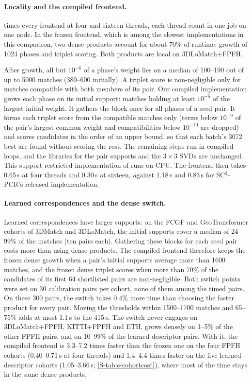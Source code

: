 \paragraph{Locality and the compiled frontend.}  times every frontend at four and sixteen threads, each thread count in one job on one node. In the frozen \ls{} frontend, which is among the slowest implementations in this comparison, two dense products account for about 70\% of runtime: growth of 1024 phases and triplet scoring. Both products are local on 3DLoMatch+FPFH.

After growth, all but $10^{-6}$ of a phase's weight lies on a median of 100--190 out of up to 5000 matches (380--600 initially). A triplet score is non-negligible only for matches compatible with both members of its pair. Our compiled implementation grows each phase on its initial support: matches holding at least $10^{-6}$ of the largest initial weight. It gathers the block once for all phases of a seed pair. It forms each triplet score from the compatible matches only (terms below $10^{-9}$ of the pair's largest common weight and compatibilities below $10^{-10}$ are dropped) and scores candidates in the order of an upper bound, so that each batch's 3072 best are found without scoring the rest. The remaining steps run in compiled loops, and the libraries for the pair supports and the $3\times3$ SVDs are unchanged. This support-restricted implementation of  runs on CPU. The \ls{} frontend then takes 0.65\,s at four threads and 0.30\,s at sixteen, against 1.18\,s and 0.83\,s for SC$^2$-PCR's released implementation.

\paragraph{Learned correspondences and the dense switch.} Learned correspondences have larger supports: on the FCGF and GeoTransformer cohorts of 3DMatch and 3DLoMatch, the initial supports cover a median of 24--99\% of the matches (ten pairs each). Gathering these blocks for each seed pair costs more than using dense products. The compiled frontend therefore keeps the frozen dense growth when a pair's initial supports average more than 1600 matches, and the frozen dense triplet scores when more than 70\% of the candidates of its first 64 shortlisted pairs are non-negligible. Both switch points were set on 30 calibration pairs per cohort, none of them among the timed pairs. On these 300 pairs, the switch takes 0.4\% more time than choosing the faster product for every pair. Moving the thresholds within 1500--1700 matches and 65--75\% adds at most 1.1\,s to the 415\,s. The switch never engages on 3DLoMatch+FPFH, KITTI+FPFH and ETH, grows densely on 1--5\% of the other FPFH pairs, and on 10--99\% of the learned-descriptor pairs. With it, the compiled frontend is 3.3--7.2 times faster than the frozen one on the four FPFH cohorts (0.40--0.71\,s at four threads) and 1.4--4.4 times faster on the five learned-descriptor cohorts (1.05--3.66\,s; \cref{S-tab:s-cohortcost}), where most of the time stays in the same dense products.

